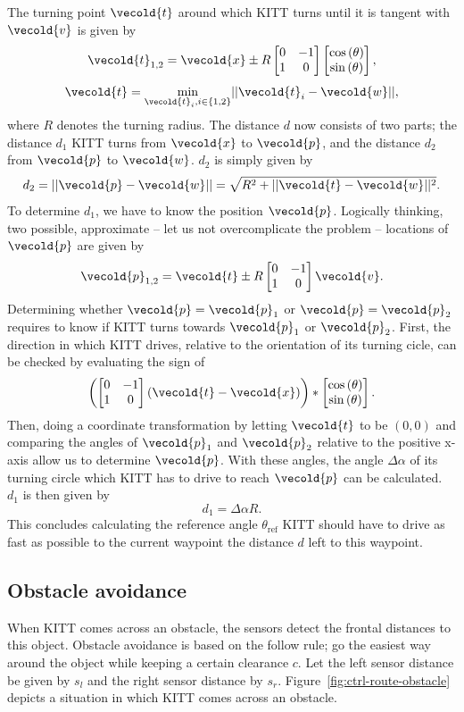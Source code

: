 \documentclass[11pt,titlepage]{report}
\let\vec\vecold
\newcommand{\vec}[1]{\mathbf{#1}}
\begin{document}
The turning point $\vec{t}$ around which KITT turns until it is tangent with $\vec{v}$ is given by
\[
	\vec{t}_{1,2} = \vec{x} \pm R \begin{bmatrix}
		0 & -1 \\
		1 & 0
	\end{bmatrix} \begin{bmatrix}
		\cos{(\theta)} \\ \sin{(\theta)}
	\end{bmatrix},
\]
\[
	\vec{t} = \underset{\vec{t}_i, i \in \{1,2\}}{\operatorname{min}} ||\vec{t}_i - \vec{w} ||,
\]
where $R$ denotes the turning radius. The distance $d$ now consists of two parts; the distance $d_1$ KITT turns from $\vec{x}$ to $\vec{p}$, and the distance $d_2$ from $\vec{p}$ to $\vec{w}$. $d_2$ is simply given by
\[
	d_2 = ||\vec{p}-\vec{w}|| = \sqrt{R^2 + ||\vec{t} - \vec{w}||^2}.
\]
To determine $d_1$, we have to know the position $\vec{p}$. Logically thinking, two possible, approximate -- let us not overcomplicate the problem -- locations of $\vec{p}$ are given by
\[
	\vec{p}_{1,2} = \vec{t} \pm R \begin{bmatrix}
		0 & -1 \\
		1 & 0
	\end{bmatrix} \vec{v}.
\]
Determining whether $\vec{p} = \vec{p}_1$ or $\vec{p} = \vec{p}_2$ requires to know if KITT turns towards $\vec{p}_1$ or $\vec{p}_2$. First, the direction in which KITT drives, relative to the orientation of its turning cicle, can be checked by evaluating the sign of
\[
	\left( \begin{bmatrix}
		0 & -1 \\
		1 & 0
	\end{bmatrix} \left( \vec{t} - \vec{x} \right) \right) \ast \begin{bmatrix}
		\cos{(\theta)} \\
		\sin{(\theta)}
	\end{bmatrix}.
\]
Then, doing a coordinate transformation by letting $\vec{t}$ to be $(0,0)$ and comparing the angles of $\vec{p}_1$ and $\vec{p}_2$ relative to the positive x-axis allow us to determine $\vec{p}$. With these angles, the angle $\Delta \alpha$ of its turning circle which KITT has to drive to reach $\vec{p}$ can be calculated. $d_1$ is then given by
\[
	d_1 = \Delta \alpha R.
\]
This concludes calculating the reference angle $\theta_{\text{ref}}$ KITT should have to drive as fast as possible to the current waypoint the distance $d$ left to this waypoint.

\subsection{Obstacle avoidance}
When KITT comes across an obstacle, the sensors detect the frontal distances to this object. Obstacle avoidance is based on the follow rule; go the easiest way around the object while keeping a certain clearance $c$. Let the left sensor distance be given by $s_l$ and the right sensor distance by $s_r$. Figure~\ref{fig:ctrl-route-obstacle} depicts a situation in which KITT comes across an obstacle.
\end{document}
